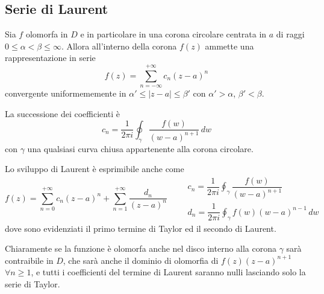 \documentclass[11pt,a4paper,twoside]{book}
\newenvironment{osservazione}[1][Osservazione]{ 
  \begin{center}\begin{tcolorbox}[
  title={#1:~},
  width=0.9\linewidth,
  flush right,
  enhanced jigsaw, 
  colback=white, 
  frame hidden, 
  sharpish corners, arc=3mm,
  borderline west = {1pt}{0pt}{gray},
  borderline south = {1pt}{0pt}{gray},
  coltitle=black, 
  fonttitle=\small\bfseries, 
  attach title to upper, 
  breakable,
  top=2.5pt, bottom=0.3pt]\small
  }{
 \normalsize \end{tcolorbox}\end{center}
}
\theoremstyle{esss}
\theoremstyle{dotless}
\numberwithin{equation}{section} %
\begin{document}
\subsection*{Serie di Laurent}

Sia $f$ olomorfa in $D$ e in particolare in una corona circolare centrata in $a$ di raggi $0\leq\alpha<\beta\leq\infty$. Allora all'interno della corona	$f(z)$ ammette una rappresentazione in serie
\begin{equation}
f(z)=\sum_{n=-\infty}^{+\infty} c_n (z-a)^n  
\end{equation}
convergente uniformememente in $\alpha'\leq|z-a|\leq\beta'$ con $\alpha'>\alpha$, $\beta'<\beta$.

La successione dei coefficienti è 
\begin{equation}
c_n=\dfrac{1}{2\pi i}\oint_\gamma \dfrac{f(w)}{(w-a)^{n+1}}\,dw
\end{equation}
con $\gamma$ una qualsiasi curva chiusa appartenente alla corona circolare.

\begin{osservazione}
Lo sviluppo di Laurent è esprimibile anche come
\[
f(z)=\sum_{n=0}^{+\infty} c_n (z-a)^n + \sum_{n=1}^{+\infty} \dfrac{d_n}{(z-a)^n} \qquad \begin{array}{c} c_n=\dfrac{1}{2\pi i}\oint_\gamma \dfrac{f(w)}{(w-a)^{n+1}} \\ d_n=\dfrac{1}{2\pi i}\oint_\gamma f(w)(w-a)^{n-1}\, dw\end{array}
\]
dove sono evidenziati il primo termine di Taylor ed il secondo di Laurent.

Chiaramente se la funzione è olomorfa anche nel disco interno alla corona $\gamma$ sarà contraibile in $D$, che sarà anche il dominio di olomorfia di $f(z)(z-a)^{n+1}$ $\forall n\geq 1$, e tutti i coefficienti del termine di Laurent saranno nulli lasciando solo la serie di Taylor.
\end{osservazione}
\end{document}
